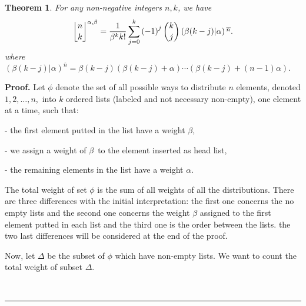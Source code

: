 \documentclass{article}
\newcommand {\lah}[2]{\genfrac\lfloor \rfloor{0pt}{}{#1}{#2}}
\newtheorem{theorem}{Theorem}
\newenvironment{proof}[1][Proof]{\noindent\textbf{#1.} }{\ \rule{0.5em}{0.5em}}
\begin{document}
\begin{theorem}
For any non-negative integers $n,k$, we have
\begin{equation}
\lah{n}{k}^{\alpha ,\beta }=\frac{1}{\beta ^{k}k!}%
\sum_{j=0}^{k}\left( -1\right) ^{j}\dbinom{k}{j}\left( \beta (k-j)|\alpha
\right) \overline{^{n}}.
\end{equation}
where $\left( \beta \left( k-j\right)|\alpha \right) ^{\overline{n}}= \beta \left(
k-j\right) \left( \beta \left( k-j\right) +\alpha \right) \cdots \left(
\beta \left( k-j\right) +(n-1)\alpha \right).$
\end{theorem}

\begin{proof}
Let $\phi$ denote the set of all possible ways to distribute $n$
elements, denoted $1,2,\ldots ,n$,\ into $k$ ordered lists (labeled and not
necessary non-empty), one element at a time, such that:

- the first element putted in the list have a weight $\beta $,

- we assign a weight of $\beta $\ to the element inserted as head list,

- the remaining elements in the list have a weight $\alpha $.

The total weight of set $\phi $ is the sum of all weights of all the
distributions. There are three differences with the initial interpretation:
the first one concerns the no empty lists and the second one concerns the
weight $\beta $ assigned to the first element putted in each list and the
third one is the order between the lists. the two last differences will be
considered at the end of the proof.


Now, let $\Delta $ be the subset of $\phi $ which have non-empty lists.
We want to count the total weight of subset $\Delta $.


\end{proof}
\end{document}
